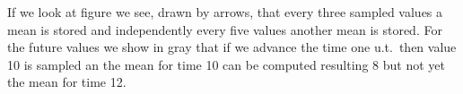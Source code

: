 If we look at figure we see, drawn by arrows, that every three sampled
values a mean is stored and independently every five values another
mean is stored. For the future values we show in gray that if we
advance the time one u.t.\ then value 10 is sampled an the mean for
time 10 can be computed resulting 8 but not yet the mean for time 12.





